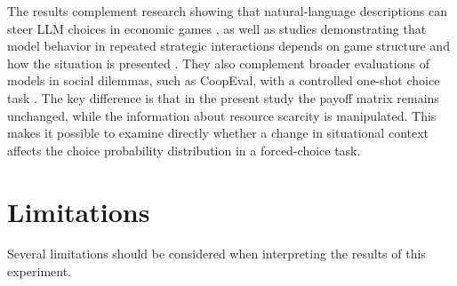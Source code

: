 \documentclass[11pt]{article}
\begin{document}
The results complement research showing that natural-language descriptions can steer LLM choices in economic games \citep{phelps2025machine}, as well as studies demonstrating that model behavior in repeated strategic interactions depends on game structure and how the situation is presented \citep{akata2025repeated,pal2026robust}. They also complement broader evaluations of models in social dilemmas, such as CoopEval, with a controlled one-shot choice task \citep{tewolde2026coopeval}. The key difference is that in the present study the payoff matrix remains unchanged, while the information about resource scarcity is manipulated. This makes it possible to examine directly whether a change in situational context affects the choice probability distribution in a forced-choice task.

\section{Limitations}\label{sec:limits}

Several limitations should be considered when interpreting the results of this experiment.
\end{document}
